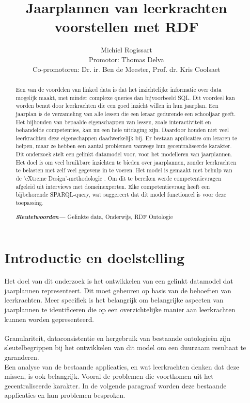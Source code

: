 \documentclass[12pt,journal]{IEEEtran}
\providecommand{\keywords}[1]
{
  \small	
  \textbf{\textit{Sleutelwoorden---}} #1
}
\begin{document}
\pagestyle{empty}
\title{Jaarplannen van leerkrachten voorstellen met RDF}
\author{Michiel Rogissart\\[12pt]
	\large Promotor: Thomas Delva \\
	Co-promotoren: Dr. ir. Ben de Meester, Prof. dr. Kris Coolsaet}
\maketitle


\setcounter{page}{3}
\thispagestyle{plain}
\pagestyle{plain}
\begin{abstract}
	Een van de voordelen van linked data is dat het inzichtelijke informatie over data mogelijk maakt, met minder complexe queries dan bijvoorbeeld SQL\cite{sqlvsqparql}.
	Dit voordeel kan worden benut door leerkrachten die een goed inzicht willen in hun jaarplan. Een jaarplan is de verzameling van alle lessen die een leraar gedurende een schooljaar geeft.
	Het bijhouden van bepaalde eigenschappen van lessen, zoals interactiviteit en behandelde competenties, kan nu een hele uitdaging zijn.
	Daardoor houden niet veel leerkrachten deze eigenschappen daadwerkelijk bij.
	Er bestaan applicaties om leraren te helpen, maar ze hebben een aantal problemen vanwege hun gecentraliseerde karakter.\\
	Dit onderzoek stelt een gelinkt datamodel voor, voor het modelleren van jaarplannen. Het doel is om veel bruikbare inzichten te bieden over jaarplannen, zonder leerkrachten te belasten met zelf veel gegevens in te voeren.
	Het model is gemaakt met behulp van de `eXtreme Design'-methodologie \cite{xd}.
	Om dit te bereiken werde competentievragen afgeleid uit interviews met domeinexperten.
	Elke competentievraag heeft een bijbehorende SPARQL-query, wat suggereert dat dit model functioneel is voor deze toepassing.
	\keywords{Gelinkte data, Onderwijs, RDF Ontologie}
\end{abstract}

\section{Introductie en doelstelling}
\noindent Het doel van dit onderzoek is het ontwikkelen van een gelinkt datamodel dat jaarplannen representeert. Dit moet gebeuren op basis van de behoeften van leerkrachten.
	Meer specifiek is het belangrijk om belangrijke aspecten van jaarplannen te identificeren die op een overzichtelijke manier aan leerkrachten kunnen worden gepresenteerd. \\ \\
	Granulariteit, dataconsistentie en hergebruik van bestaande ontologieën zijn sleutelbegrippen bij het ontwikkelen van dit model om een duurzaam resultaat te garanderen.\\
	Een analyse van de bestaande applicaties, en wat leerkrachten denken dat deze missen, is ook belangrijk. Vooral de problemen die voortkomen uit het gecentraliseerde karakter.
	In de volgende paragraaf worden deze bestaande applicaties en hun problemen besproken.
\end{document}
